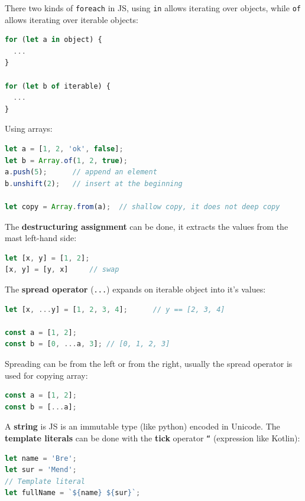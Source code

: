 \documentclass[12pt]{article}
\begin{document}
There two kinds of \texttt{foreach} in JS, using \texttt{in} allows iterating over objects, while \texttt{of} allows iterating over iterable objects:
\begin{lstlisting}[language=js]
for (let a in object) {
  ...
}

for (let b of iterable) {
  ...
}
\end{lstlisting}
Using arrays:
\begin{lstlisting}[language=js]
let a = [1, 2, 'ok', false];
let b = Array.of(1, 2, true);
a.push(5);      // append an element
b.unshift(2);   // insert at the beginning

let copy = Array.from(a);  // shallow copy, it does not deep copy
\end{lstlisting}
The \textbf{destructuring assignment} can be done, it extracts the values from the mast left-hand side:
\begin{lstlisting}[language=js]
let [x, y] = [1, 2];
[x, y] = [y, x]     // swap
\end{lstlisting}
The \textbf{spread operator} (\texttt{...}) expands on iterable object into it's values:
\begin{lstlisting}[language=js]
let [x, ...y] = [1, 2, 3, 4];      // y == [2, 3, 4]

const a = [1, 2];
const b = [0, ...a, 3]; // [0, 1, 2, 3]
\end{lstlisting}
Spreading can be from the left or from the right, usually the spread operator is used for copying array:
\begin{lstlisting}[language=js]
const a = [1, 2];
const b = [...a];
\end{lstlisting}
A \textbf{string} is JS is an immutable type (like python) encoded in Unicode. The \textbf{template literals} can be done with the \textbf{tick} operator \texttt{``} (expression like Kotlin):
\begin{lstlisting}[language=js]
let name = 'Bre';
let sur = 'Mend';
// Template literal
let fullName = `${name} ${sur}`;
\end{lstlisting}
\end{document}
